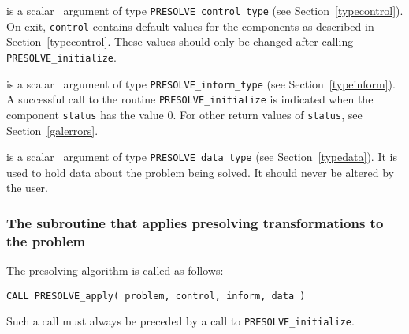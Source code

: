 \documentclass{galahad}
\newcommand{\packagename}{PRESOLVE}
\begin{document}
\begin{description}
 is a scalar \intentout\ argument of type 
{\tt \packagename\_control\_type}
(see Section~\ref{typecontrol}). 
On exit, {\tt control} contains default values for the components as
described in Section~\ref{typecontrol}.
These values should only be changed after calling 
{\tt \packagename\_initialize}.

 is a scalar \intentout\ argument of type 
{\tt \packagename\_inform\_type} (see Section~\ref{typeinform}).  
A successful call to the routine {\tt \packagename\_initialize}
is indicated when the  component {\tt status} has the value 0. 
For other return values of {\tt status}, see Section~\ref{galerrors}.

 is a scalar \intentinout\ argument of type 
{\tt \packagename\_data\_type}
(see Section~\ref{typedata}). It is used to hold data about the problem being 
solved. It should never be altered by the user. 
\end{description}


\subsubsection{The subroutine that applies presolving transformations to the problem}
The presolving algorithm is called as follows:
\vspace*{1mm}

\hspace{8mm}
{\tt CALL \packagename\_apply( problem, control, inform, data )}
\vspace*{1mm}

\noindent
Such a call must always be preceded by a call to {\tt \packagename\_initialize}.
\end{document}
